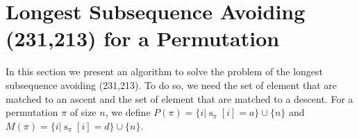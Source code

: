 \documentclass[a4paper]{llncs}
\newcommand{\ptext}{\pi}
\newcommand{\pmotif}{\sigma}
\DeclareMathOperator{\stripea}{s}
\newcommand{\stripe}[2]{\stripea_{{#1}}[{#2}]}
\newcommand{\dstep}{d}
\newcommand{\ustep}{a}
\newcommand{\x}{X}
\newcommand{\y}{Y}
\newcommand{\pbmotif}{\pmotif^+}
\DeclareMathOperator{\PMa}{PM}
\newcommand{\PM}[6]{\PMa_{{#1}}^{{#2},{#3},{#4}}({#5},{#6})}
\begin{document}
%	
%	
%	
%			
%	
%



\section{Longest Subsequence Avoiding \\(231,213) for a Permutation}
\label{section:LCS}

	In this section we present an algorithm to solve the problem
	of the longest subsequence avoiding (231,213).
	To do so, we need the set of element
	that are matched to an ascent and the
	set of element that are matched to a descent.
	For a permutation $\pi$ of size $n$, we define
	$P(\pi) = \{i | \stripe{\pi}{i} = \ustep \} \cup \{n\}$ and
	$M(\pi) = \{i | \stripe{\pi}{i} = \dstep \} \cup \{n\}$.\\
\end{document}
